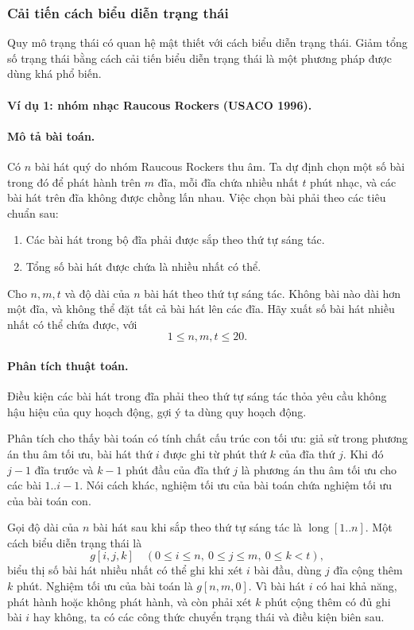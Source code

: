 \documentclass[11pt]{article}
\begin{document}
\subsubsection{Cải tiến cách biểu diễn trạng thái}

Quy mô trạng thái có quan hệ mật thiết với cách biểu diễn trạng thái. Giảm
tổng số trạng thái bằng cách cải tiến biểu diễn trạng thái là một phương pháp
được dùng khá phổ biến.

\paragraph{Ví dụ 1: nhóm nhạc Raucous Rockers (USACO 1996).}

\paragraph{Mô tả bài toán.}
Có \(n\) bài hát quý do nhóm Raucous Rockers thu âm. Ta dự định chọn một số
bài trong đó để phát hành trên \(m\) đĩa, mỗi đĩa chứa nhiều nhất \(t\) phút
nhạc, và các bài hát trên đĩa không được chồng lấn nhau. Việc chọn bài phải
theo các tiêu chuẩn sau:
\begin{enumerate}
  \item Các bài hát trong bộ đĩa phải được sắp theo thứ tự sáng tác.
  \item Tổng số bài hát được chứa là nhiều nhất có thể.
\end{enumerate}
Cho \(n,m,t\) và độ dài của \(n\) bài hát theo thứ tự sáng tác. Không bài nào
dài hơn một đĩa, và không thể đặt tất cả bài hát lên các đĩa. Hãy xuất số bài
hát nhiều nhất có thể chứa được, với
\[
  1\le n,m,t\le 20.
\]

\paragraph{Phân tích thuật toán.}
Điều kiện các bài hát trong đĩa phải theo thứ tự sáng tác thỏa yêu cầu không
hậu hiệu của quy hoạch động, gợi ý ta dùng quy hoạch động.

Phân tích cho thấy bài toán có tính chất cấu trúc con tối ưu: giả sử trong
phương án thu âm tối ưu, bài hát thứ \(i\) được ghi từ phút thứ \(k\) của đĩa
thứ \(j\). Khi đó \(j-1\) đĩa trước và \(k-1\) phút đầu của đĩa thứ \(j\) là
phương án thu âm tối ưu cho các bài \(1..i-1\). Nói cách khác, nghiệm tối ưu
của bài toán chứa nghiệm tối ưu của bài toán con.

Gọi độ dài của \(n\) bài hát sau khi sắp theo thứ tự sáng tác là
\(\operatorname{long}[1..n]\). Một cách biểu diễn trạng thái là
\[
  g[i,j,k]\quad (0\le i\le n,\ 0\le j\le m,\ 0\le k<t),
\]
biểu thị số bài hát nhiều nhất có thể ghi khi xét \(i\) bài đầu, dùng \(j\)
đĩa cộng thêm \(k\) phút. Nghiệm tối ưu của bài toán là \(g[n,m,0]\). Vì bài
hát \(i\) có hai khả năng, phát hành hoặc không phát hành, và còn phải xét
\(k\) phút cộng thêm có đủ ghi bài \(i\) hay không, ta có các công thức
chuyển trạng thái và điều kiện biên sau.
\end{document}
